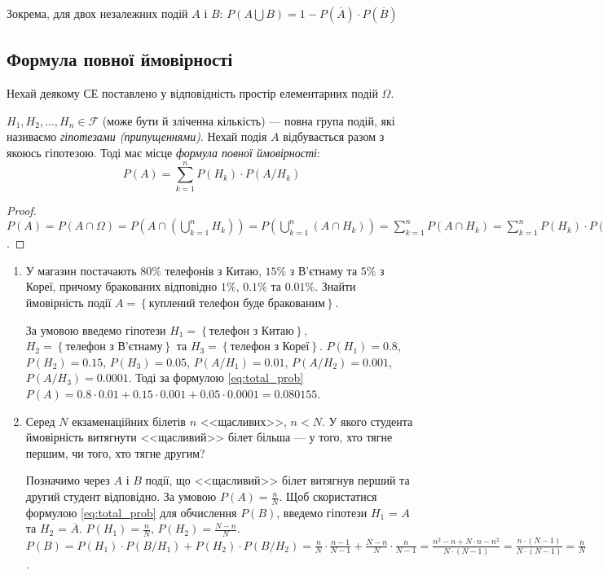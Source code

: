 \noindent Зокрема, для двох незалежних подій $A$ і $B$: $P(A\bigcup B) = 1 - P(\overline{A}) \cdot P(\overline{B})$

\subsection{Формула повної ймовірності}
Нехай деякому СЕ поставлено у відповідність простір елементарних подій $\Omega$.

$H_1, H_2, ..., H_n \in \mathcal{F}$ (може бути й зліченна кількість) --- повна група подій,
які називаємо \emph{гіпотезами (припущеннями)}.
Нехай подія $A$ відбувається разом з якоюсь гіпотезою. Тоді має місце
\emph{формула повної ймовірності}:
\begin{equation}\label{eq:total_prob}
    P\left( A \right) = \sum\limits_{k=1}^n P(H_k)\cdot P(A/H_k)
\end{equation}
\begin{proof}
    $P(A) = P(A \cap \Omega) = P\left(A \cap \left(\bigcup\limits_{k=1}^n H_k\right)\right) = P\left(\bigcup\limits_{k=1}^n (A\cap H_k)\right) = \sum\limits_{k=1}^n P(A\cap H_k) = \sum\limits_{k=1}^n P(H_k)\cdot P(A/H_k)$.
\end{proof}

\begin{example}
    \begin{enumerate}
        \item У магазин постачають $80\%$ телефонів з Китаю, $15\%$ з В'єтнаму та $5\%$ з Кореї,
        причому бракованих відповідно $1\%$, $0.1\%$ та $0.01\%$.
        Знайти ймовірність події $A = \left\{ \text{куплений телефон буде бракованим}\right\}$.

        За умовою введемо гіпотези $H_1 = \left\{ \text{телефон з Китаю}\right\}$,
        $H_2 = \left\{ \text{телефон з В'єтнаму}\right\}$ та $H_3 = \left\{ \text{телефон з Кореї}\right\}$.
        $P(H_1) = 0.8$, $P(H_2) = 0.15$, $P(H_3) = 0.05$,
        $P(A/H_1) = 0.01$, $P(A/H_2) = 0.001$, $P(A/H_3) = 0.0001$.
        Тоді за формулою \eqref{eq:total_prob} $P(A) = 0.8\cdot 0.01 + 0.15\cdot 0.001 + 0.05\cdot 0.0001 = 0.080155$.
        \item Серед $N$ екзаменаційних білетів $n$ <<щасливих>>, $n<N$.
        У якого студента ймовірність витягнути <<щасливий>> білет більша --- у того, хто тягне першим, чи того, хто тягне другим?

        Позначимо через $A$ і $B$ події, що <<щасливий>> білет витягнув перший та другий студент відповідно. За умовою $P(A) = \frac{n}{N}$.
        Щоб скористатися формулою \eqref{eq:total_prob} для обчислення $P(B)$, введемо гіпотези $H_1$ = $A$ та $H_2$ = $\overline{A}$.
        $P(H_1) = \frac{n}{N}$, $P(H_2) = \frac{N-n}{N}$.
        \\ $P(B) = P(H_1)\cdot P(B/H_1) + P(H_2)\cdot P(B/H_2) = \frac{n}{N}\cdot \frac{n-1}{N-1} + \frac{N-n}{N}\cdot \frac{n}{N-1} = 
        \frac{n^2 - n + N\cdot n - n^2}{N\cdot(N-1)} = \frac{n\cdot (N-1)}{N\cdot(N-1)} = \frac{n}{N}$.
    \end{enumerate}
\end{example}

